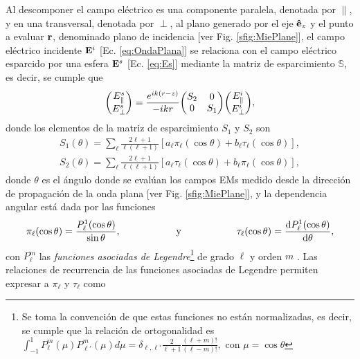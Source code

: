 \documentclass[letterpaper,11pt] {article}
\begin{document}
Al descomponer el campo eléctrico es una componente paralela, denotada por $\parallel$, y en una transversal, denotada por $\perp$, al plano generado por el eje $\vu{e}_z$ y el punto a evaluar $\vb{r}$, denominado plano de incidencia [ver Fig.  \ref{sfig:MiePlane}], el campo eléctrico incidente $\vb{E}^i$ [Ec.  \eqref{eq:OndaPlana}] se relaciona con el campo eléctrico  esparcido por una esfera $\vb{E}^s$ [Ec.  \eqref{eq:Es}]   mediante la matriz de esparcimiento $\mathbb{S}$, es decir, se cumple que
	\begin{equation}
	\mqty(E_{\parallel}^s\\ E_{\perp}^s) = \frac{e^{ik(r-z)}}{-ikr} \mqty(\dmat[0]{S_2,S_1})\mqty(E_{\parallel}^i\\ E_{\perp}^i),
	\label{eq:ScatterMat}
	\end{equation}
donde los elementos de la matriz de esparcimiento $S_1$ y $S_2$ son \cite{bohren1998absorption}
	\begin{subequations}	
	\begin{align}
	S_1(\theta) = \sum_\ell \frac{2\ell+1}{\ell(\ell+1)} [a_\ell\pi_\ell (\cos\theta)+ b_\ell\tau_\ell(\cos\theta)], \label{eq:S1}\\
	S_2 (\theta)= \sum_\ell \frac{2\ell+1}{\ell(\ell+1)} [a_\ell\tau_\ell(\cos\theta) + b_\ell\pi_\ell(\cos\theta)], \label{eq:S2}
	\end{align}\label{eq:SMatElements}
	\end{subequations}
\hspace{-.5em}donde $\theta$ es el ángulo donde se evalúan los campos EMs medido desde la dirección de propagación de la onda plana [ver Fig.  \ref{sfig:MiePlane}], y la dependencia angular está dada por las funciones
	\begin{align*}
	\pi_\ell(\cos\theta)= \frac{P_\ell^1(\cos\theta)}{\sin\theta},
	\hspace{2cm}\mbox{y}\hspace{2cm}
	\tau_\ell(\cos\theta) = \dv{P_\ell^1(\cos\theta)}{\theta},
	\end{align*}
con $P_\ell^m$   las \emph{funciones asociadas de Legendre}\footnote{Se toma la convención de que estas funciones no están normalizadas, es decir, se cumple que la relación de ortogonalidad es $\int_{-1}^1 P_\ell^m(\mu)P_{\ell'}^m(\mu)d\mu = \delta_{\ell,\ell'} \frac{2}{\ell+1}\frac{(\ell+m)!}{(\ell-m)!},$ con $\mu=\cos\theta$}  de grado $\ell$ y orden $m$ \cite{bohren1998absorption,arfken2001methods}.  Las relaciones de recurrencia de las funciones asociadas de Legendre \cite{arfken2001methods} permiten expresar a  $\pi_\ell$ y $\tau_\ell$ como  
\end{document}
